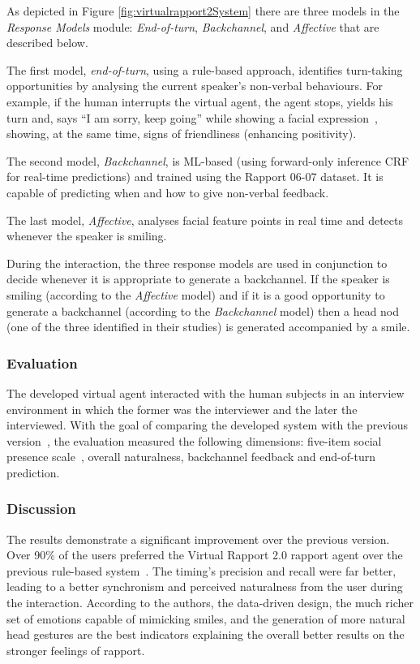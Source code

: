 As depicted in Figure \ref{fig:virtualrapport2System} there are three models in the \textit{Response Models} module: \textit{End-of-turn}, \textit{Backchannel}, and \textit{Affective} that are described below.

The first model, \textit{end-of-turn}, using a rule-based approach, identifies turn-taking opportunities by analysing the current speaker's non-verbal behaviours. For example, if the human interrupts the virtual agent, the agent stops, yields his turn and, says ``I am sorry, keep going'' while showing a facial expression~\cite{Buschmeier2011}, showing, at the same time, signs of friendliness (enhancing positivity).

The second model, \textit{Backchannel}, is \ac{ML}-based (using forward-only inference \ac{CRF}~\cite{Bishop2006} for real-time predictions) and trained using the Rapport 06-07 dataset. It is capable of predicting when and how to give non-verbal feedback.

The last model, \textit{Affective}, analyses facial feature points in real time and detects whenever the speaker is smiling.
 
During the interaction, the three response models are used in conjunction to decide whenever it is appropriate to generate a backchannel. If the speaker is smiling (according to the \textit{Affective} model) and if it is a good opportunity to generate a backchannel (according to the \textit{Backchannel} model) then a head nod (one of the three identified in their studies) is generated accompanied by a smile.

\subsubsection*{Evaluation}
The developed virtual agent interacted with the human subjects in an interview environment in which the former was the interviewer and the later the interviewed. With the goal of comparing the developed system with the previous version~\cite{Gratch2006}, the evaluation measured the following dimensions: five-item social presence scale~\cite{Bailenson2001}, overall naturalness, backchannel feedback and end-of-turn prediction.



\subsubsection*{Discussion}
The results demonstrate a significant improvement over the previous version. Over 90\% of the users preferred the Virtual Rapport 2.0 rapport agent over the previous rule-based system~\cite{Gratch2006, Morency2008}. The timing's precision and recall were far better, leading to a better synchronism and perceived naturalness from the user during the interaction. According to the authors, the data-driven design, the much richer set of emotions capable of mimicking smiles, and the generation of more natural head gestures are the best indicators explaining the overall better results on the stronger feelings of rapport.

